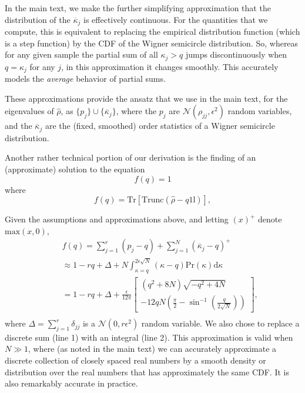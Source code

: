\documentclass[aps,pra, twocolumn]{revtex4}
\newcommand{\Tr}{\mathrm{Tr}}
\def\Id{1\!\mathrm{l}}
\begin{document}
In the main text, we make the further simplifying approximation that the distribution of the $\overline{\kappa}_j$ is effectively continuous.  For the quantities that we compute, this is equivalent to replacing the empirical distribution function (which is a step function) by the CDF of the Wigner semicircle distribution.  So, whereas for any given sample the partial sum of all $\kappa_j > q$ jumps discontinuously when $q=\kappa_j$ for any $j$, in this approximation it changes smoothly.  This accurately models the \emph{average} behavior of partial sums.

These approximations provide the ansatz that we use in the main text, for the eigenvalues of $\hat\rho$, as $\{p_j\} \cup \{\overline{\kappa}_j\}$, where the $p_j$ are $\mathcal{N}(\rho_{jj},\epsilon^2)$ random variables, and the $\overline{\kappa}_j$ are the (fixed, smoothed) order statistics of a Wigner semicircle distribution.  

Another rather technical portion of our derivation is the finding of an (approximate) solution to the equation
\begin{equation}
f(q) = 1
\end{equation}
 where
\begin{equation}
f(q) = \Tr\left[\mathrm{Trunc}(\hat\rho-q\Id)\right],
\end{equation}

Given the assumptions and approximations above, and letting $(x)^+$ denote $\mathrm{max}(x,0)$, 
\begin{eqnarray}
\nonumber &&f(q) = \sum_{j=1}^{r}(p_j - q) + \sum_{j=1}^{N}{(\overline{\kappa}_j-q)^+} \\
\nonumber &&\approx 1 - rq + \Delta + N\int_{\kappa=q}^{2\epsilon\sqrt{N}}{(\kappa-q)\mathrm{Pr}(\kappa)\mathrm{d}\kappa}\\
&&= 1 - rq + \Delta + \frac{\epsilon}{12\pi}\left[
\begin{array}{l} (q^2+8N)\sqrt{-q^2+4N} \\
-12qN\left(\frac{\pi}{2}-\sin^{-1}\left(\frac{q}{2\sqrt{N}}\right)\right)
\end{array}\right],\nonumber\\
~
\end{eqnarray}
where $\Delta = \sum_{j=1}^{r}\delta_{jj}$ is a $\mathcal{N}(0,r\epsilon^2)$ random variable.  We also chose to replace a discrete 
sum (line 1) with an integral (line 2).  This approximation is valid when $N\gg1$, where (as noted in the main text) we can accurately approximate a discrete collection of closely spaced real numbers by a smooth density or distribution over the real numbers that has approximately the same CDF.  It is also remarkably accurate in practice.
  
\end{document}

